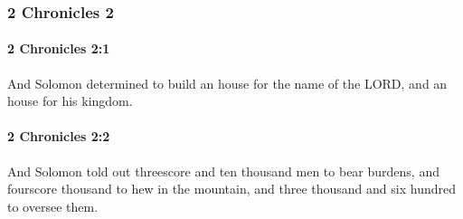 	\subsubsection{2 Chronicles 2} %
		\label{2CHRONICLES-2}

		\paragraph{2 Chronicles 2:1} %
			\label{2CHRONICLES-2-1}

			And Solomon determined to build an house for the name of the LORD, and an house for his kingdom.


		\paragraph{2 Chronicles 2:2} %
			\label{2CHRONICLES-2-2}

			And Solomon told out threescore and ten thousand men to bear burdens, and fourscore thousand to hew in the mountain, and three thousand and six hundred to oversee them.

